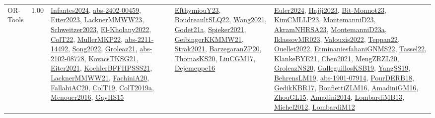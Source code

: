 {\begin{longtable}{p{3cm}r>{\raggedright\arraybackslash}p{6cm}>{\raggedright\arraybackslash}p{6cm}>{\raggedright\arraybackslash}p{8cm}}
\index{OR-Tools}\index{CPSystems!OR-Tools}OR-Tools &  1.00 & \hyperref[detail:Infantes2024]{Infantes2024}, \hyperref[detail:abs-2402-00459]{abs-2402-00459}, \hyperref[detail:Eiter2023]{Eiter2023}, \hyperref[detail:LacknerMMWW23]{LacknerMMWW23}, \hyperref[detail:Schweitzer2023]{Schweitzer2023}, \hyperref[detail:El-Kholany2022]{El-Kholany2022}, \hyperref[detail:ColT22]{ColT22}, \hyperref[detail:MullerMKP22]{MullerMKP22}, \hyperref[detail:abs-2211-14492]{abs-2211-14492}, \hyperref[detail:Song2022]{Song2022}, \hyperref[detail:Groleaz21]{Groleaz21}, \hyperref[detail:abs-2102-08778]{abs-2102-08778}, \hyperref[detail:KovacsTKSG21]{KovacsTKSG21}, \hyperref[detail:Eiter2021]{Eiter2021}, \hyperref[detail:KoehlerBFFHPSSS21]{KoehlerBFFHPSSS21}, \hyperref[detail:LacknerMMWW21]{LacknerMMWW21}, \hyperref[detail:FachiniA20]{FachiniA20}, \hyperref[detail:FallahiAC20]{FallahiAC20}, \hyperref[detail:ColT19]{ColT19}, \hyperref[detail:ColT2019a]{ColT2019a}, \hyperref[detail:Menouer2016]{Menouer2016}, \hyperref[detail:GayHS15]{GayHS15} & \hyperref[detail:EfthymiouY23]{EfthymiouY23}, \hyperref[detail:BoudreaultSLQ22]{BoudreaultSLQ22}, \hyperref[detail:Wang2021]{Wang2021}, \hyperref[detail:Godet21a]{Godet21a}, \hyperref[detail:Spieker2021]{Spieker2021}, \hyperref[detail:GeibingerKKMMW21]{GeibingerKKMMW21}, \hyperref[detail:Strak2021]{Strak2021}, \hyperref[detail:BarzegaranZP20]{BarzegaranZP20}, \hyperref[detail:ThomasKS20]{ThomasKS20}, \hyperref[detail:LiuCGM17]{LiuCGM17}, \hyperref[detail:Dejemeppe16]{Dejemeppe16} & \hyperref[detail:Euler2024]{Euler2024}, \hyperref[detail:Hajji2023]{Hajji2023}, \hyperref[detail:Bit-Monnot23]{Bit-Monnot23}, \hyperref[detail:KimCMLLP23]{KimCMLLP23}, \hyperref[detail:MontemanniD23]{MontemanniD23}, \hyperref[detail:AkramNHRSA23]{AkramNHRSA23}, \hyperref[detail:MontemanniD23a]{MontemanniD23a}, \hyperref[detail:IklassovMR023]{IklassovMR023}, \hyperref[detail:Valouxis2022]{Valouxis2022}, \hyperref[detail:Teppan22]{Teppan22}, \hyperref[detail:Ouellet2022]{Ouellet2022}, \hyperref[detail:EtminaniesfahaniGNMS22]{EtminaniesfahaniGNMS22}, \hyperref[detail:Tassel22]{Tassel22}, \hyperref[detail:KlankeBYE21]{KlankeBYE21}, \hyperref[detail:Chen2021]{Chen2021}, \hyperref[detail:MengZRZL20]{MengZRZL20}, \hyperref[detail:GroleazNS20]{GroleazNS20}, \hyperref[detail:GalleguillosKSB19]{GalleguillosKSB19}, \hyperref[detail:YangSS19]{YangSS19}, \hyperref[detail:BehrensLM19]{BehrensLM19}, \hyperref[detail:abs-1901-07914]{abs-1901-07914}, \hyperref[detail:PourDERB18]{PourDERB18}, \hyperref[detail:GedikKBR17]{GedikKBR17}, \hyperref[detail:BonfiettiZLM16]{BonfiettiZLM16}, \hyperref[detail:AmadiniGM16]{AmadiniGM16}, \hyperref[detail:ZhouGL15]{ZhouGL15}, \hyperref[detail:Amadini2014]{Amadini2014}, \hyperref[detail:LombardiMB13]{LombardiMB13}, \hyperref[detail:Michel2012]{Michel2012}, \hyperref[detail:LombardiM12]{LombardiM12}\\

\end{longtable}}
